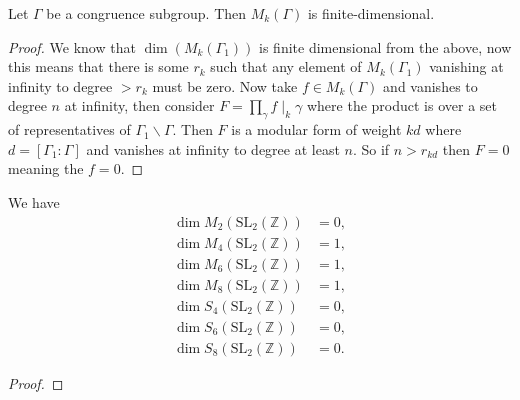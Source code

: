 \begin{theorem}\label{thm:dim-mf-general-level}\leanok {}
Let $\Gamma$ be a congruence subgroup. Then $M_k(\Gamma)$ is finite-dimensional.
\end{theorem}
\begin{proof}
We know that $\dim(M_k(\Gamma_1))$ is finite dimensional from the above, now this means that there is some $r_k$ such that any element of $M_k(\Gamma_1)$ vanishing at infinity to degree $> r_k$ must be zero. Now take $f \in M_k(\Gamma)$ and vanishes to degree $n$ at infinity, then consider $F = \prod_\gamma f\mid_k \gamma$ where the product is over a set of representatives of $\Gamma_1 \backslash \Gamma$. Then $F$ is a modular form of weight $k d$ where $d = [\Gamma_1: \Gamma]$ and vanishes at infinity to degree at least $n$. So if $n > r_{kd}$ then $F=0$ meaning the $f=0$.
\end{proof}


\begin{corollary}\label{cor:dim-mf}\leanok
We have
\begin{align}
    \dim M_2(\mathrm{SL}_{2}(\mathbb{Z})) &= 0, \label{eqn:dimM2} \\
    \dim M_4(\mathrm{SL}_{2}(\mathbb{Z})) &= 1, \label{eqn:dimM4} \\
    \dim M_6(\mathrm{SL}_{2}(\mathbb{Z})) &= 1, \label{eqn:dimM6} \\
    \dim M_8(\mathrm{SL}_{2}(\mathbb{Z})) &= 1, \label{eqn:dimM8} \\
    \dim S_4(\mathrm{SL}_{2}(\mathbb{Z})) &= 0, \label{eqn:dimS4} \\
    \dim S_6(\mathrm{SL}_{2}(\mathbb{Z})) &= 0, \label{eqn:dimS6} \\
    \dim S_8(\mathrm{SL}_{2}(\mathbb{Z})) &= 0. \label{eqn:dimS8}
\end{align}
\end{corollary}
\begin{proof}
\leanok
\end{proof}

